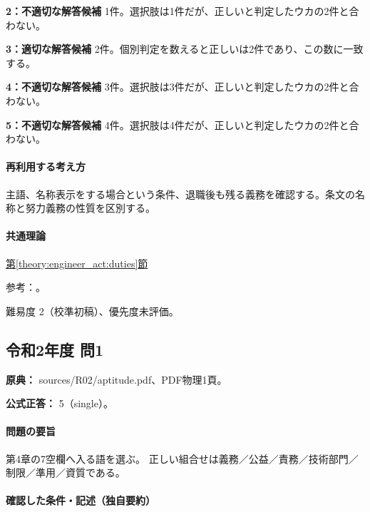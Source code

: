 \noindent\textbf{2：不適切な解答候補} 1件。選択肢は1件だが、正しいと判定したウカの2件と合わない。\par

\noindent\textbf{3：適切な解答候補} 2件。個別判定を数えると正しいは2件であり、この数に一致する。\par

\noindent\textbf{4：不適切な解答候補} 3件。選択肢は3件だが、正しいと判定したウカの2件と合わない。\par

\noindent\textbf{5：不適切な解答候補} 4件。選択肢は4件だが、正しいと判定したウカの2件と合わない。\par

\paragraph{再利用する考え方} 主語、名称表示をする場合という条件、退職後も残る義務を確認する。条文の名称と努力義務の性質を区別する。

\paragraph{共通理論} \hyperref[theory:engineer_act:duties]{第\ref*{theory:engineer_act:duties}節}

\par 参考：\cite{engineer_act_current}。

\par 難易度 2（校準初稿）、優先度未評価。

\subsection{令和2年度 問1}
\label{q:r02-reg-apt-01}

\noindent\textbf{原典：} sources/R02/aptitude.pdf、PDF物理1頁。

\textbf{公式正答：} 5（single）。

\paragraph{問題の要旨} 第4章の7空欄へ入る語を選ぶ。 正しい組合せは義務／公益／責務／技術部門／制限／準用／資質である。

\paragraph{確認した条件・記述（独自要約）}\mbox{}\par

